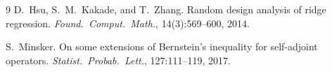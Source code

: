 \documentclass[11pt]{article}
\begin{document}
\begin{thebibliography}{9}
 D.~Hsu, S.~M.~Kakade, and T.~Zhang.
Random design analysis of ridge regression.
\textit{Found.\ Comput.\ Math.}, 14(3):569--600, 2014.

 S.~Minsker.
On some extensions of Bernstein's inequality for self-adjoint operators.
\textit{Statist.\ Probab.\ Lett.}, 127:111--119, 2017.
\end{thebibliography}
\end{document}
